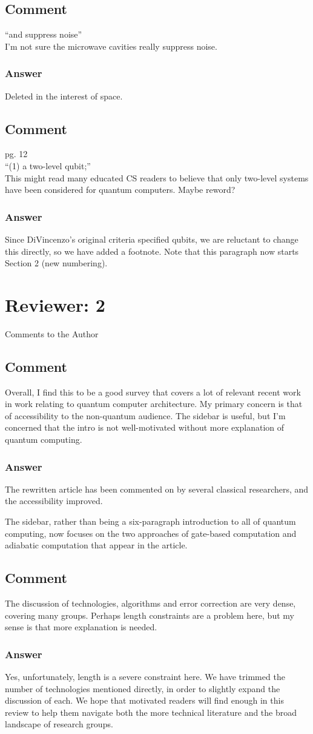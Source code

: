 \documentclass{article}
\newcommand{\comment}{\subsection{Comment}\em}
\newcommand{\answer}{\rm \subsubsection*{Answer}}
\begin{document}
\comment

``and suppress noise''\\
I'm not sure the microwave cavities really suppress noise.

\answer

Deleted in the interest of space.

\comment

pg. 12\\
``(1) a two-level qubit;''\\
This might read many educated CS readers to believe that only
two-level systems have been considered for quantum computers.  Maybe
reword?

\answer

Since DiVincenzo's original criteria specified qubits, we are
reluctant to change this directly, so we have added a footnote.  Note
that this paragraph now starts Section 2 (new numbering).

\section{Reviewer: 2}

Comments to the Author

\comment

Overall, I find this to be a good survey that covers a lot of relevant
recent work in work relating to quantum computer architecture.
My primary concern is that of accessibility to the non-quantum audience.
The sidebar is useful, but I'm concerned that the intro is not well-motivated
without more explanation of quantum computing.  

\answer

The rewritten article has been commented on by several classical
researchers, and the accessibility improved.

The sidebar, rather than being a six-paragraph introduction to all of
quantum computing, now focuses on the two approaches of gate-based
computation and adiabatic computation that appear in the article.

\comment

The discussion of technologies, algorithms and error correction are very
dense, covering many groups.  Perhaps length constraints are a problem
here, but my sense is that more explanation is needed.

\answer

Yes, unfortunately, length is a severe constraint here.  We have
trimmed the number of technologies mentioned directly, in order to
slightly expand the discussion of each.  We hope that motivated readers
will find enough in this review to help them navigate both the more
technical literature and the broad landscape of research groups.
\end{document}
